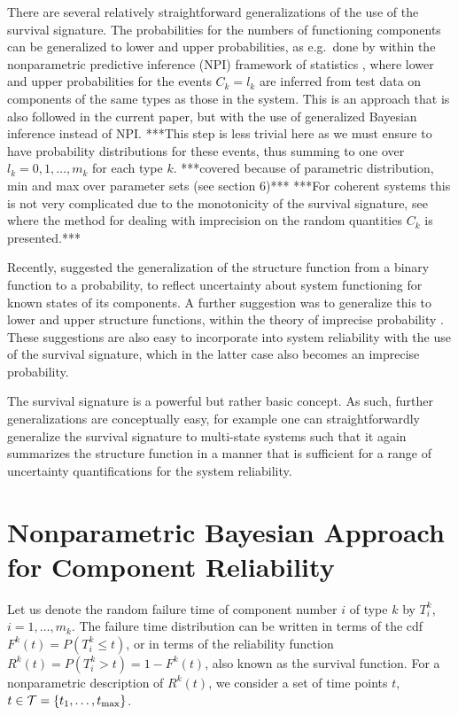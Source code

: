 \documentclass[12pt, a4paper]{elsarticle}
\def\tmax{t_\text{max}}
\newcommand{\td}[1]{%
  \iftoggle{td}{%
    \todo[inline]{#1}%
  }{}%
}
\begin{document}
There are several relatively straightforward generalizations of the use of the survival signature.
The probabilities for the numbers of functioning components can be generalized to lower and upper probabilities,
as e.g.\ done by \citet{CCMA14} within the nonparametric predictive inference (NPI) framework of statistics \citep{Co11},
where lower and upper probabilities for the events $C_k = l_k$
are inferred from test data on components of the same types as those in the system.
This is an approach that is also followed in the current paper, but with the use of generalized Bayesian inference instead of NPI.
***This step is less trivial here as we must ensure to have probability distributions for these events,
thus summing to one over $l_k=0,1,\ldots,m_k$ for each type $k$.
***covered because of parametric distribution, min and max over parameter sets (see section 6)***
***For coherent systems this is not very complicated due to the monotonicity of the survival signature,
see \citet{CCMA14} where the method for dealing with imprecision on the random quantities $C_k$ is presented.***
\td{Leave out the sentences framed with `***'?}
Recently, \citet{CCM16} suggested the generalization of the structure function from a binary function to a probability,
to reflect uncertainty about system functioning for known states of its components.
A further suggestion was to generalize this to lower and upper structure functions,
within the theory of imprecise probability \citep{itip,CU11}.
These suggestions are also easy to incorporate into system reliability with the use of the survival signature,
which in the latter case also becomes an imprecise probability.  

The survival signature is a powerful but rather basic concept.
As such, further generalizations are conceptually easy,
for example one can straightforwardly generalize the survival signature to multi-state systems
such that it again summarizes the structure function
in a manner that is sufficient for a range of uncertainty quantifications for the system reliability. 


\section{Nonparametric Bayesian Approach for Component Reliability}
\label{sec:nonparamapproach}

Let us denote the random failure time of component number $i$ of type $k$ by $T^k_i$, $i = 1, \ldots, m_k$.
The failure time distribution can be written in terms of the cdf $F^k(t) = P(T^k_i \le t)$,
or in terms of the reliability function $R^k(t) = P(T^k_i > t) = 1 - F^k(t)$,
also known as the survival function.
For a nonparametric description of $R^k(t)$,
we consider a set of time points $t$, $t \in {\cal T} = \{t_1, \ldots, \tmax\}$.
\end{document}
